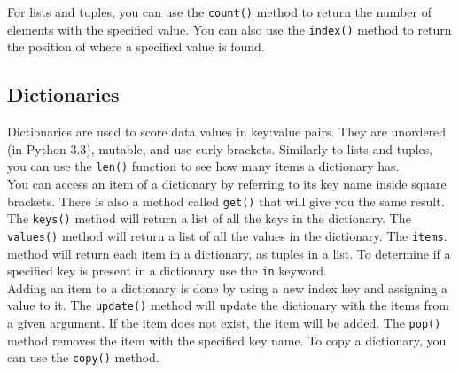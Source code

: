 \documentclass[11pt]{scrartcl}
\theoremstyle{definition}
\begin{document}
For lists and tuples, you can use the \texttt{count()} method to return the number of elements with the specified value. You 
can also use the \texttt{index()} method to return the position of where a specified value is found.

\subsection{Dictionaries}

Dictionaries are used to score data values in key:value pairs. They are unordered (in Python 3.3), mutable, and use curly brackets. Similarly 
to lists and tuples, you can use the \texttt{len()} function to see how many items a dictionary has. \\[-0.5em]

You can access an item of a dictionary by referring to its key name inside square brackets. There is also a method called \texttt{get()} 
that will give you the same result. The \texttt{keys()} method will return a list of all the keys in the dictionary. The 
\texttt{values()} method will return a list of all the values in the dictionary. The \texttt{items}. method will return 
each item in a dictionary, as tuples in a list. To determine if a specified key is present in a dictionary use the \texttt{in} keyword. \\[-0.5em]

Adding an item to a dictionary is done by using a new index key and assigning a value to it. The \texttt{update()} method will update the 
dictionary with the items from a given argument. If the item does not exist, the item will be added. The \texttt{pop()} method removes the item 
with the specified key name. To copy a dictionary, you can use the \texttt{copy()} method. 
\end{document}
